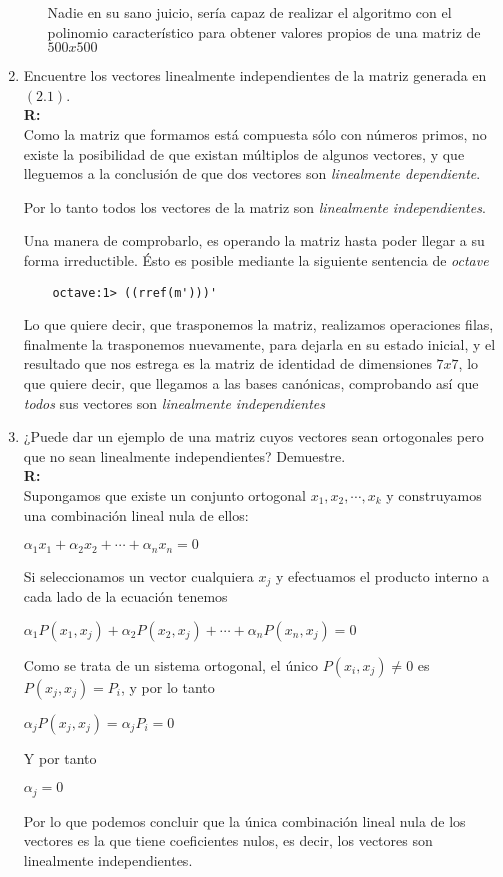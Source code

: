 \begin{enumerate}
\begin{enumerate}
		Nadie en su sano juicio,
		sería capaz de realizar el algoritmo con el polinomio característico
		para obtener valores propios de una matriz de $500x500$

	\end{enumerate}
	\item Encuentre los vectores linealmente independientes de la matriz generada en $(2.1)$.\\
	\textbf{R:}\\
	Como la matriz que formamos está compuesta sólo con números primos,
	no existe la posibilidad de que existan múltiplos de algunos vectores,
	y que lleguemos a la conclusión de que dos vectores son \emph{linealmente dependiente}.

	Por lo tanto todos los vectores de la matriz son \emph{linealmente independientes}.

	Una manera de comprobarlo,
	es operando la matriz hasta poder llegar a su forma irreductible.
	Ésto es posible mediante la siguiente sentencia de \emph{octave}\\
	\begin{verbatim}
	octave:1> ((rref(m')))'
	\end{verbatim}
	Lo que quiere decir, que trasponemos la matriz, realizamos operaciones filas,
	finalmente la trasponemos nuevamente, para dejarla en su estado inicial, y el
	resultado que nos estrega es la matriz de identidad de dimensiones $7x7$,
	lo que quiere decir, que llegamos a las bases canónicas, comprobando así
	que \emph{todos} sus vectores son \emph{linealmente independientes}
	
	
	

	\item ¿Puede dar un ejemplo de una matriz cuyos vectores sean ortogonales pero que no sean
		linealmente independientes? Demuestre.\\
		\textbf{R:}\\
		Supongamos que existe un conjunto ortogonal $ x_1,x_2,\cdots,x_k$ y construyamos una combinación
		lineal nula de ellos:

		$\displaystyle \alpha_1x_1+\alpha_2x_2+\cdots+\alpha_nx_n=0 $

		Si seleccionamos un vector cualquiera $ x_j$ y efectuamos el producto interno a cada lado
		de la ecuación tenemos

		$\displaystyle \alpha_1P(x_1,x_j)+\alpha_2P(x_2,x_j)+\cdots+\alpha_nP(x_n,x_j)=0 $

		Como se trata de un sistema ortogonal, el único $ P(x_i,x_j)\neq 0$ es $ P(x_j,x_j)=P_i$, y
		por lo tanto

		$\displaystyle \alpha_jP(x_j,x_j)=\alpha_jP_i=0 $

		Y por tanto

		$\displaystyle \alpha_j=0 $

		Por lo que podemos concluir que la única combinación lineal nula de los vectores es la
		que tiene coeficientes nulos, es decir, los vectores son linealmente independientes.

\end{enumerate}



